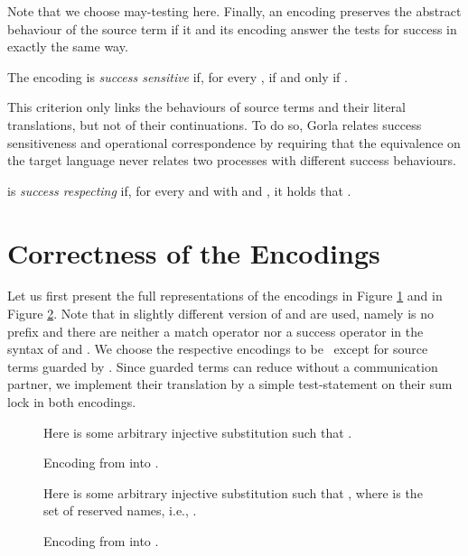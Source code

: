 \documentclass[]{llncs}
\begin{document}
\noindent
Note that we choose may-testing here. Finally, an encoding preserves the abstract behaviour of the source term if it and its encoding answer the tests for success in exactly the same way.

\begin{definition}
\label{def:succesSensitiveness}
  The encoding  is \emph{success sensitive} if, for every ,  if and only if .
\end{definition}

\noindent
This criterion only links the behaviours of source terms and their literal translations, but not of their continuations. To do so, Gorla relates success sensitiveness and operational correspondence by requiring that the equivalence on the target language never relates two processes with different success behaviours.

\begin{definition}
\label{def:successRespecting}
	 is \emph{success respecting} if, for every  and  with  and , it holds that .
\end{definition}

\section{Correctness of the Encodings} \label{sec:CorrectnessEncodings}

Let us first present the full representations of the encodings  in Figure \ref{fig:encodingSepAsyn} and  in Figure \ref{fig:encodingMixAsyn}. Note that in \cite{nestmann00,nestmannPierce00} slightly different version of \piSep and \piAsyn are used, namely  is no prefix and there are neither a match operator nor a success operator in the syntax of \piSep and \piAsyn. We choose the respective encodings to be \clean \ except for source terms guarded by . Since  guarded terms can reduce without a communication partner, we implement their translation by a simple test-statement on their sum lock in both encodings.

\begin{figure}[ht]
	
	\begin{center}
		Here  is some arbitrary injective substitution such that .
	\end{center}
	\caption{Encoding from \piSep into \piAsyn.} \label{fig:encodingSepAsyn}
\end{figure}

\begin{figure}[htp]
	
	\begin{center}
		Here  is some arbitrary injective substitution such that , where  is the set of reserved names, i.e., .
	\end{center}
	\caption{Encoding  from \piMix into \piAsyn.} \label{fig:encodingMixAsyn}
\end{figure}
\end{document}
